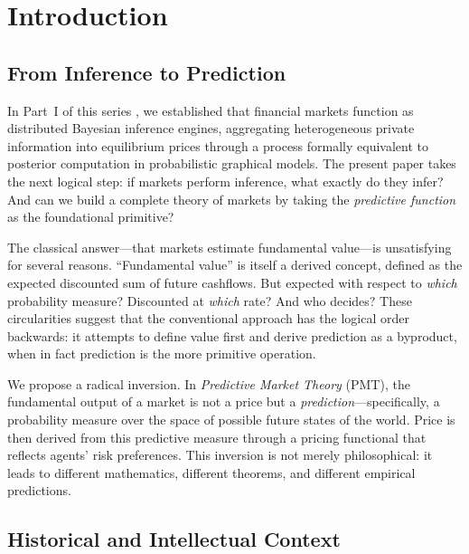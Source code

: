 \documentclass[12pt,a4paper]{article}
\theoremstyle{definition}
\begin{document}
\newpage
\tableofcontents
\newpage


\section{Introduction}\label{sec:intro}

\subsection{From Inference to Prediction}

In Part~I of this series \citep{long2026part1}, we established that financial markets function as distributed Bayesian inference engines, aggregating heterogeneous private information into equilibrium prices through a process formally equivalent to posterior computation in probabilistic graphical models. The present paper takes the next logical step: if markets perform inference, what exactly do they infer? And can we build a complete theory of markets by taking the \emph{predictive function} as the foundational primitive?

The classical answer---that markets estimate fundamental value---is unsatisfying for several reasons. ``Fundamental value'' is itself a derived concept, defined as the expected discounted sum of future cashflows. But expected with respect to \emph{which} probability measure? Discounted at \emph{which} rate? And who decides? These circularities suggest that the conventional approach has the logical order backwards: it attempts to define value first and derive prediction as a byproduct, when in fact prediction is the more primitive operation.

We propose a radical inversion. In \emph{Predictive Market Theory} (PMT), the fundamental output of a market is not a price but a \emph{prediction}---specifically, a probability measure over the space of possible future states of the world. Price is then derived from this predictive measure through a pricing functional that reflects agents' risk preferences. This inversion is not merely philosophical: it leads to different mathematics, different theorems, and different empirical predictions.

\subsection{Historical and Intellectual Context}
\end{document}
